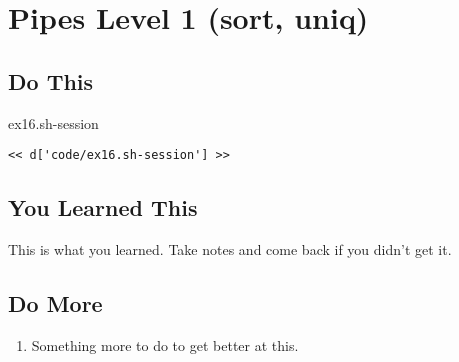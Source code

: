 \chapter{Pipes Level 1 (sort, uniq)}

\section{Do This}

\begin{code}{ex16.sh-session}
\begin{Verbatim}
<< d['code/ex16.sh-session'] >>
\end{Verbatim}
\end{code}


\section{You Learned This}

This is what you learned.  Take notes and come back if you didn't get it.

\section{Do More}

\begin{enumerate}
\item Something more to do to get better at this.
\end{enumerate}

